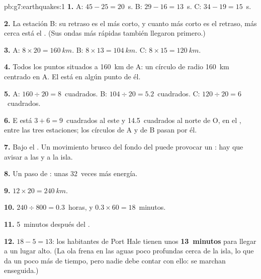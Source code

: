 \begin{solution}{pb:g7:earthquakes:1}
\textbf{1.} A: $45 - 25 = 20$~s. B: $29 - 16 = 13$~s. C: $34 - 19 =
15$~s.

\textbf{2.} La estación B: su retraso es el más corto, y cuanto más corto
es el retraso, más cerca está el . (Sus ondas más rápidas también
llegaron primero.)

\textbf{3.} A: $8 \times 20 = \qty{160}{km}$. B: $8 \times 13 =
\qty{104}{km}$. C: $8 \times 15 = \qty{120}{km}$.

\textbf{4.} Todos los puntos situados a \qty{160}{km} de A: un círculo de
radio \qty{160}{km} centrado en A. El  está en algún punto de él.

\textbf{5.} A: $160 \div 20 = 8$~cuadrados. B: $104 \div 20 = 5.2$~cuadrados.
C: $120 \div 20 = 6$~cuadrados.

\textbf{6.} E está $3 + 6 = 9$~cuadrados al este y 14.5~cuadrados al norte
de O, en el , entre las tres estaciones; los círculos de A y de B pasan
por él.

\textbf{7.} Bajo el . Un movimiento brusco del fondo del  puede
provocar un : hay que avisar a las  y a la isla.

\textbf{8.} Un paso de : unas 32~veces más energía.

\textbf{9.} $12 \times 20 = \qty{240}{km}$.

\textbf{10.} $240 \div 800 = 0.3$~horas, y $0.3 \times 60 = 18$~minutos.

\textbf{11.} 5~minutos después del .

\textbf{12.} $18 - 5 = 13$: los habitantes de Port Hale tienen unos
\textbf{13~minutos} para llegar a un lugar alto. (La ola frena en las aguas
poco profundas cerca de la isla, lo que da un poco más de tiempo, pero
nadie debe contar con ello: se marchan enseguida.)
\end{solution}
